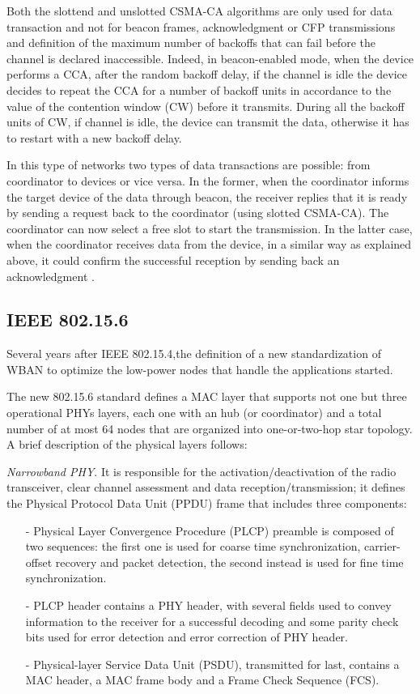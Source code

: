 \documentclass[conference]{IEEEtran}
\begin{document}
Both the slottend and unslotted CSMA-CA algorithms are only used for data transaction and not for beacon frames, acknowledgment or CFP transmissions and definition of the maximum number of backoffs that can fail before the channel is declared inaccessible. Indeed, in beacon-enabled mode, when the device performs a CCA, after the random backoff delay, if the channel is idle the device decides to repeat the CCA for a number of backoff units in accordance to the value of the contention window (CW) before it transmits. During all the backoff units of CW, if channel is idle, the device can transmit the data, otherwise it has to restart with a new backoff delay. 

In this type of networks two types of data transactions are possible: from coordinator to devices or vice versa. In the former, when the coordinator informs the target device of the data through beacon, the receiver replies that it is ready by sending a request back to the coordinator (using slotted CSMA-CA). The coordinator can now select a free slot to start the transmission. In the latter case, when the coordinator receives data from the device, in a similar way as explained above, it could confirm the successful reception by sending back an acknowledgment \cite{li2009performance}.


\subsection{IEEE 802.15.6}
Several years after IEEE 802.15.4,the definition of a new standardization of WBAN to optimize the low-power nodes that handle the applications started.

The new 802.15.6 standard defines a MAC layer that supports not one but three operational PHYs layers, each one with an hub (or coordinator) and a total number of at most 64 nodes that are organized into one-or-two-hop star topology. A brief description of the physical layers follows:
\newline

\textit{Narrowband PHY}. It is responsible for the activation/deactivation of the radio transceiver, clear channel assessment and data reception/transmission; it defines the Physical Protocol Data Unit (PPDU) frame that includes three components: 
\begin{itemize}
	\item[-] Physical Layer Convergence Procedure (PLCP) preamble is composed of two sequences: the first one is used for coarse time synchronization, carrier-offset recovery and packet detection, the second instead is used for fine time synchronization.
	\item[-] PLCP header contains a PHY header, with several fields used to convey information to the receiver for a successful decoding and some parity check bits used for error detection and error correction of PHY header.
	\item[-] Physical-layer Service Data Unit (PSDU), transmitted for last, contains a MAC header, a MAC frame body and a Frame Check Sequence (FCS).
\end{itemize}
\hfill
\end{document}
